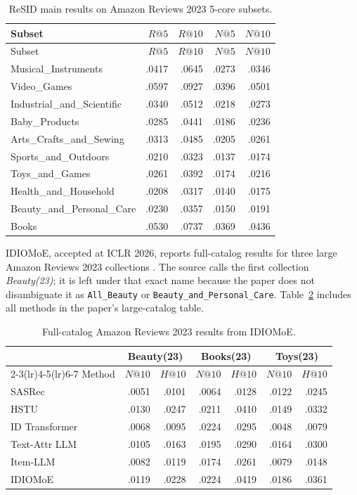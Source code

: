 \begin{longtable}{@{}p{}rrrr@{}}
\caption{ReSID main results on Amazon Reviews 2023 5-core subsets.}
\label{tab:resid-amazon23}\\
\toprule
Subset & $R@5$ & $R@10$ & $N@5$ & $N@10$ \\
\midrule
\endfirsthead
\toprule
Subset & $R@5$ & $R@10$ & $N@5$ & $N@10$ \\
\midrule
\endhead
Musical\_Instruments & .0417 & .0645 & .0273 & .0346 \\
Video\_Games & .0597 & .0927 & .0396 & .0501 \\
Industrial\_and\_Scientific & .0340 & .0512 & .0218 & .0273 \\
Baby\_Products & .0285 & .0441 & .0186 & .0236 \\
Arts\_Crafts\_and\_Sewing & .0313 & .0485 & .0205 & .0261 \\
Sports\_and\_Outdoors & .0210 & .0323 & .0137 & .0174 \\
Toys\_and\_Games & .0261 & .0392 & .0174 & .0216 \\
Health\_and\_Household & .0208 & .0317 & .0140 & .0175 \\
Beauty\_and\_Personal\_Care & .0230 & .0357 & .0150 & .0191 \\
Books & .0530 & .0737 & .0369 & .0436 \\
\bottomrule
\end{longtable}

IDIOMoE, accepted at ICLR 2026, reports full-catalog results for three large
Amazon Reviews 2023 collections \cite{IDIOMOE}. The source calls the first
collection \emph{Beauty(23)}; it is left under that exact name because the
paper does not disambiguate it as \texttt{All\_Beauty} or
\texttt{Beauty\_and\_Personal\_Care}. Table~\ref{tab:idiomoe-amazon23}
includes all methods in the paper's large-catalog table.

\begin{table}[H]
\centering
\caption{Full-catalog Amazon Reviews 2023 results from IDIOMoE.}
\label{tab:idiomoe-amazon23}
\footnotesize
\begin{tabular}{@{}lrrrrrr@{}}
\toprule
& \multicolumn{2}{c}{Beauty(23)} & \multicolumn{2}{c}{Books(23)}
& \multicolumn{2}{c}{Toys(23)} \\
\cmidrule(lr){2-3}\cmidrule(lr){4-5}\cmidrule(lr){6-7}
Method & $N@10$ & $H@10$ & $N@10$ & $H@10$ & $N@10$ & $H@10$ \\
\midrule
SASRec & .0051 & .0101 & .0064 & .0128 & .0122 & .0245 \\
HSTU & .0130 & .0247 & .0211 & .0410 & .0149 & .0332 \\
ID Transformer & .0068 & .0095 & .0224 & .0295 & .0048 & .0079 \\
Text-Attr LLM & .0105 & .0163 & .0195 & .0290 & .0164 & .0300 \\
Item-LLM & .0082 & .0119 & .0174 & .0261 & .0079 & .0148 \\
IDIOMoE & .0119 & .0228 & .0224 & .0419 & .0186 & .0361 \\
\bottomrule
\end{tabular}
\end{table}

